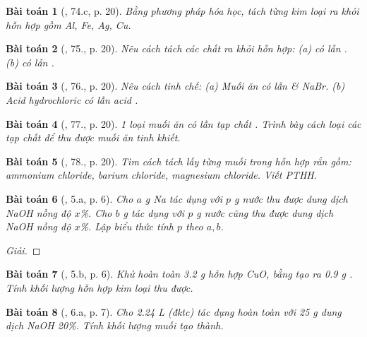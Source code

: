 \documentclass{article}
\newtheorem{baitoan}{Bài toán}
\begin{document}
\begin{baitoan}[\cite{An_400_BT_Hoa_Hoc_9}, 74.c, p. 20]
	Bằng phương pháp hóa học, tách từng kim loại ra khỏi hỗn hợp gồm {\rm Al, Fe, Ag, Cu}.
\end{baitoan}

\begin{baitoan}[\cite{An_400_BT_Hoa_Hoc_9}, 75., p. 20]
	Nêu cách tách các chất ra khỏi hỗn hợp: (a) {\rm{} có lẫn }. (b) {\rm{} có lẫn }.
\end{baitoan}

\begin{baitoan}[\cite{An_400_BT_Hoa_Hoc_9}, 76., p. 20]
	Nêu cách tinh chế: (a) Muối ăn có lẫn {\rm{}} \& {\rm NaBr}. (b) Acid hydrochloric có lẫn acid {\rm{}}.
\end{baitoan}

\begin{baitoan}[\cite{An_400_BT_Hoa_Hoc_9}, 77., p. 20]
	1 loại muối ăn có lẫn tạp chất {\rm{}}. Trình bày cách loại các tạp chất để thu được muối ăn tinh khiết.
\end{baitoan}

\begin{baitoan}[\cite{An_400_BT_Hoa_Hoc_9}, 78., p. 20]
	Tìm cách tách lấy từng muối trong hỗn hợp rắn gồm: ammonium chloride, barium chloride, magnesium chloride. Viết {\rm PTHH}.
\end{baitoan}

\begin{baitoan}[\cite{An_350_BT_Hoa_Hoc_9}, 5.a, p. 6]
	Cho $a$ \emph{g Na} tác dụng với $p$ \emph{g} nước thu được dung dịch \emph{NaOH} nồng độ $x$\%. Cho $b$ \emph{g } tác dụng với $p$ \emph{g} nước cũng thu được dung dịch \emph{NaOH} nồng độ $x$\%. Lập biểu thức tính $p$ theo $a,b$.
\end{baitoan}

\begin{proof}[Giải]
	
\end{proof}

\begin{baitoan}[\cite{An_350_BT_Hoa_Hoc_9}, 5.b, p. 6]
	Khử hoàn toàn \emph{3.2 g} hỗn hợp \emph{CuO, } bằng \emph{} tạo ra \emph{0.9 g }. Tính khối lượng hỗn hợp kim loại thu được.
\end{baitoan}

\begin{baitoan}[\cite{An_350_BT_Hoa_Hoc_9}, 6.a, p. 7]
	Cho \emph{2.24 L } (đktc) tác dụng hoàn toàn với \emph{25 g} dung dịch \emph{NaOH 20\%}. Tính khối lượng muối tạo thành.
\end{baitoan}
\end{document}

